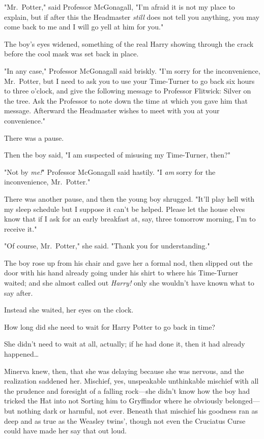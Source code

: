 "Mr.~Potter," said Professor McGonagall, "I'm afraid it is not my place to
explain, but if after this the Headmaster \emph{still} does not tell you
anything, you may come back to me and I will go yell at him for you."

The boy's eyes widened, something of the real Harry showing through the crack
before the cool mask was set back in place.

"In any case," Professor McGonagall said briskly. "I'm sorry for the
inconvenience, Mr.~Potter, but I need to ask you to use your Time-Turner to go
back six hours to three o'clock, and give the following message to Professor
Flitwick: Silver on the tree. Ask the Professor to note down the time at which
you gave him that message. Afterward the Headmaster wishes to meet with you at
your convenience."

There was a pause.

Then the boy said, "I am suspected of misusing my Time-Turner, then?"

"Not by \emph{me!}" Professor McGonagall said hastily. "I \emph{am} sorry for
the inconvenience, Mr.~Potter."

There was another pause, and then the young boy shrugged. "It'll play hell with
my sleep schedule but I suppose it can't be helped. Please let the house elves
know that if I ask for an early breakfast at, say, three \AM tomorrow morning,
I'm to receive it."

"Of course, Mr.~Potter," she said. "Thank you for understanding."

The boy rose up from his chair and gave her a formal nod, then slipped out the
door with his hand already going under his shirt to where his Time-Turner
waited; and she almost called out \emph{Harry!} only she wouldn't have known
what to say after.

Instead she waited, her eyes on the clock.

How long did she need to wait for Harry Potter to go back in time?

She didn't need to wait at all, actually; if he had done it, then it had
already happened{\ldots}

Minerva knew, then, that she was delaying because she was nervous, and the
realization saddened her. Mischief, yes, unspeakable unthinkable mischief with
all the prudence and foresight of a falling rock---she didn't know how the boy
had tricked the Hat into not Sorting him to Gryffindor where he obviously
belonged---but nothing dark or harmful, not ever. Beneath that mischief his
goodness ran as deep and as true as the Weasley twins', though not even the
Cruciatus Curse could have made her say that out loud.

